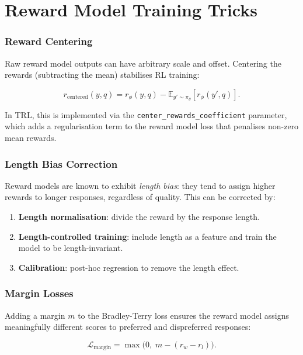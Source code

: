 \section{Reward Model Training Tricks}
\label{sec:rm-tricks}

\subsubsection*{Reward Centering}
\label{reward-centering}

Raw reward model outputs can have arbitrary scale and offset. Centering the rewards (subtracting the mean) stabilises RL training:

\[
r_{\text{centered}}(y, q) = r_\phi(y, q) - \mathbb{E}_{y' \sim \pi_\theta}[r_\phi(y', q)].
\]

In TRL, this is implemented via the \texttt{center\_rewards\_coefficient} parameter, which adds a regularisation term to the reward model loss that penalises non-zero mean rewards.

\subsubsection*{Length Bias Correction}
\label{length-bias-correction}

Reward models are known to exhibit \emph{length bias}: they tend to assign higher rewards to longer responses, regardless of quality. This can be corrected by:

\begin{enumerate}
  \item \textbf{Length normalisation}: divide the reward by the response length.
  \item \textbf{Length-controlled training}: include length as a feature and train the model to be length-invariant.
  \item \textbf{Calibration}: post-hoc regression to remove the length effect.
\end{enumerate}

\subsubsection*{Margin Losses}
\label{margin-losses}

Adding a margin $m$ to the Bradley-Terry loss ensures the reward model assigns meaningfully different scores to preferred and dispreferred responses:

\[
\mathcal{L}_{\text{margin}} = \max\!\bigl(0,\; m - (r_w - r_l)\bigr).
\]

